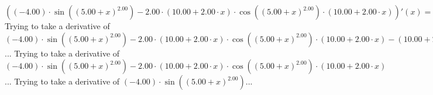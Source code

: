 \documentclass{article}
\begin{document}
$({{\left({-4.00}\right) \cdot  \sin {\left({\left({{5.00} + {x}}\right) ^ {2.00}}\right)} } - {{2.00} \cdot {\left({{10.00} + {{2.00} \cdot {x}}}\right) \cdot { \cos {\left({\left({{5.00} + {x}}\right) ^ {2.00}}\right)}  \cdot \left({{10.00} + {{2.00} \cdot {x}}}\right)}}}})'(x) = {{\left({-4.00}\right) \cdot { \cos {\left({\left({{5.00} + {x}}\right) ^ {2.00}}\right)}  \cdot \left({{10.00} + {{2.00} \cdot {x}}}\right)}} + {{\left({-4.00}\right) \cdot { \cos {\left({\left({{5.00} + {x}}\right) ^ {2.00}}\right)}  \cdot \left({{10.00} + {{2.00} \cdot {x}}}\right)}} - {{2.00} \cdot {\left({{10.00} + {{2.00} \cdot {x}}}\right) \cdot \left({{\left({-1.00}\right) \cdot {\left({{10.00} + {{2.00} \cdot {x}}}\right) \cdot {\left({{10.00} + {{2.00} \cdot {x}}}\right) \cdot  \sin {\left({\left({{5.00} + {x}}\right) ^ {2.00}}\right)} }}} + {{2.00} \cdot  \cos {\left({\left({{5.00} + {x}}\right) ^ {2.00}}\right)} }}\right)}}}}$\newline
\newline
Trying to take a derivative of ${{{\left({-4.00}\right) \cdot  \sin {\left({\left({{5.00} + {x}}\right) ^ {2.00}}\right)} } - {{2.00} \cdot {\left({{10.00} + {{2.00} \cdot {x}}}\right) \cdot { \cos {\left({\left({{5.00} + {x}}\right) ^ {2.00}}\right)}  \cdot \left({{10.00} + {{2.00} \cdot {x}}}\right)}}}} - {\left({{10.00} + {{2.00} \cdot {x}}}\right) \cdot \left({{{2.00} \cdot { \cos {\left({\left({{5.00} + {x}}\right) ^ {2.00}}\right)}  \cdot \left({{10.00} + {{2.00} \cdot {x}}}\right)}} + {{{2.00} \cdot { \cos {\left({\left({{5.00} + {x}}\right) ^ {2.00}}\right)}  \cdot \left({{10.00} + {{2.00} \cdot {x}}}\right)}} + {\left({{10.00} + {{2.00} \cdot {x}}}\right) \cdot \left({{\left({-1.00}\right) \cdot {\left({{10.00} + {{2.00} \cdot {x}}}\right) \cdot {\left({{10.00} + {{2.00} \cdot {x}}}\right) \cdot  \sin {\left({\left({{5.00} + {x}}\right) ^ {2.00}}\right)} }}} + {{2.00} \cdot  \cos {\left({\left({{5.00} + {x}}\right) ^ {2.00}}\right)} }}\right)}}}\right)}}$...\newline
\newline
Trying to take a derivative of ${{\left({-4.00}\right) \cdot  \sin {\left({\left({{5.00} + {x}}\right) ^ {2.00}}\right)} } - {{2.00} \cdot {\left({{10.00} + {{2.00} \cdot {x}}}\right) \cdot { \cos {\left({\left({{5.00} + {x}}\right) ^ {2.00}}\right)}  \cdot \left({{10.00} + {{2.00} \cdot {x}}}\right)}}}}$...\newline
\newline
Trying to take a derivative of ${\left({-4.00}\right) \cdot  \sin {\left({\left({{5.00} + {x}}\right) ^ {2.00}}\right)} }$...\newline
\end{document}
